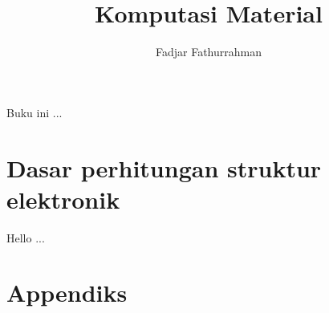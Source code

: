 \documentclass[a4paper,bahasa]{extbook}
\begin{document}
\title{Komputasi Material}
\author{Fadjar Fathurrahman}
\maketitle

\frontmatter

Buku ini ...

\tableofcontents

\mainmatter
\chapter{Dasar perhitungan struktur elektronik}

Hello ...

\appendix
\chapter{Appendiks}

\printindex
\end{document}
